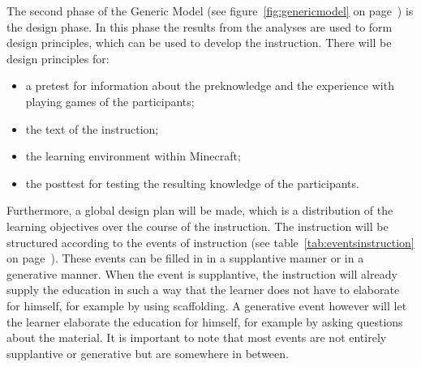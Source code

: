 \documentclass[12pt]{report} %
\begin{document}
The second phase of the Generic Model \cite{genericmodel} (see figure~\ref{fig:genericmodel} on page~\pageref{fig:genericmodel}) is the design phase. In this phase the results from the analyses are used to form design principles, which can be used to develop the instruction. There will be design principles for:
\begin{itemize}
\item a pretest for information about the preknowledge and the experience with playing games of the participants;
\item the text of the instruction;
\item the learning environment within Minecraft;
\item the posttest for testing the resulting knowledge of the participants.
\end{itemize}
Furthermore, a global design plan will be made, which is a distribution of the learning objectives over the course of the instruction. The instruction will be structured according to the events of instruction \cite{smithragan} (see table~\ref{tab:eventsinstruction} on page~\pageref{tab:eventsinstruction}). These events can be filled in in a supplantive manner or in a generative manner. When the event is supplantive, the instruction will already supply the education in such a way that the learner does not have to elaborate for himself, for example by using scaffolding. A generative event however will let the learner elaborate the education for himself, for example by asking questions about the material. It is important to note that most events are not entirely supplantive or generative but are somewhere in between.
\end{document}
